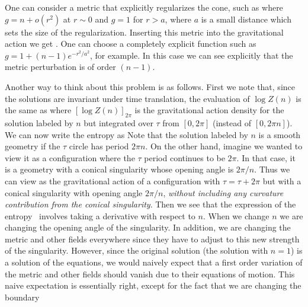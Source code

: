  One can consider a metric that explicitly regularizes the cone, such as \FursaevEF
 \eqn{}
where $g = n + o(r^2)$ at $r\sim 0$ and $g =1$ for $r > a$, where $a$ is a small distance which sets the size of the
regularization. Inserting this metric into the gravitational action we get  \inttwod . One can choose a completely
explicit function such as $ g = 1 + (n-1) e^{ - r^2/a^2 } $, for example. In this case we can see explicitly that
the metric perturbation   is of order $(n-1)$.



Another way to think about this problem is as follows.
First we note that, since the solutions are invariant under time translation, the evaluation of
$\log Z(n)$ is the same as
\eqn{}
where $ [ \log Z(n)]_{2\pi} $ is the gravitational action density for the solution labeled by $n$ but
integrated over $\tau$ from $[0,2\pi]$ (instead of $[0,2 \pi n]$).
 We can now write the entropy as
\eqn{}
Note that the solution labeled by $n$ is a smooth geometry if the $\tau $ circle has period
$ 2 \pi n $. On the other hand, imagine we wanted to view it as a configuration where
the $\tau $ period continues to be $2\pi$. In that case, it is a geometry with a conical singularity
whose opening angle is $2\pi/n$.  Thus we can view
\eqn\func{
[ \log Z(n ) ]_{2\pi}
}
as the gravitational action of a configuration with $\tau = \tau + 2 \pi$ but with a conical
singularity with opening angle $2\pi/n$, {\it without including any curvature contribution from the
conical singularity}.
Then we see that the expression of the entropy \entrp\ involves taking a derivative with respect to
$n$. When we change $n$ we are changing the opening angle of the singularity. In addition,  we are
changing the metric and other fields everywhere since they have to adjust to this new strength of the
singularity. However, since the original solution (the solution with $n=1$) is a solution of the equations,
we would naively expect that a first order variation of the metric and other fields should vanish due to their
 equations of
motion. This naive expectation is essentially right, except for the fact that we are changing the boundary
